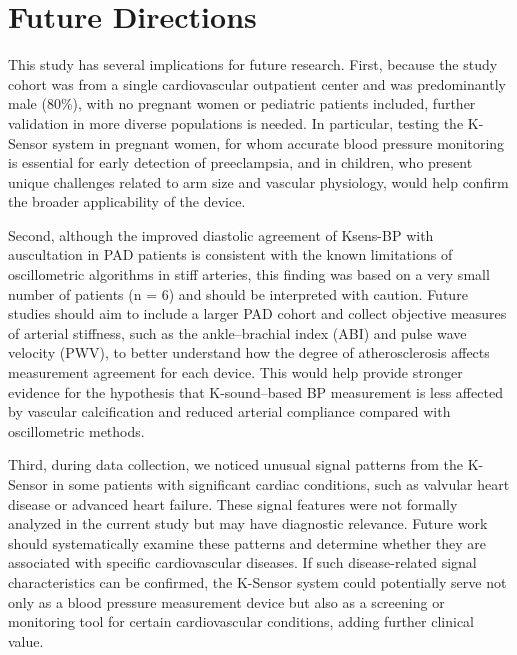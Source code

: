 \documentclass[
  12pt,
  letterpaper,
  openany,
  oneside]{book}
\begin{document}

\chapter{Future Directions}\label{future-directions}

This study has several implications for future research. First, because
the study cohort was from a single cardiovascular outpatient center and
was predominantly male (80\%), with no pregnant women or pediatric
patients included, further validation in more diverse populations is
needed. In particular, testing the K-Sensor system in pregnant women,
for whom accurate blood pressure monitoring is essential for early
detection of preeclampsia, and in children, who present unique
challenges related to arm size and vascular physiology, would help
confirm the broader applicability of the device.

Second, although the improved diastolic agreement of Ksens-BP with
auscultation in PAD patients is consistent with the known limitations of
oscillometric algorithms in stiff arteries, this finding was based on a
very small number of patients (n = 6) and should be interpreted with
caution. Future studies should aim to include a larger PAD cohort and
collect objective measures of arterial stiffness, such as the
ankle--brachial index (ABI) and pulse wave velocity (PWV), to better
understand how the degree of atherosclerosis affects measurement
agreement for each device. This would help provide stronger evidence for
the hypothesis that K-sound--based BP measurement is less affected by
vascular calcification and reduced arterial compliance compared with
oscillometric methods.

Third, during data collection, we noticed unusual signal patterns from
the K-Sensor in some patients with significant cardiac conditions, such
as valvular heart disease or advanced heart failure. These signal
features were not formally analyzed in the current study but may have
diagnostic relevance. Future work should systematically examine these
patterns and determine whether they are associated with specific
cardiovascular diseases. If such disease-related signal characteristics
can be confirmed, the K-Sensor system could potentially serve not only
as a blood pressure measurement device but also as a screening or
monitoring tool for certain cardiovascular conditions, adding further
clinical value.

\end{document}
